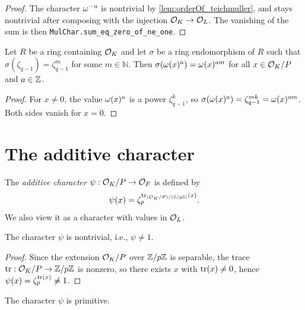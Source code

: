 \begin{proof}
  \leanok
  The character $\omega^{-a}$ is nontrivial by \ref{lem:orderOf_teichmuller}, and stays nontrivial
  after composing with the injection $\mathcal{O}_K \to \mathcal{O}_L$. The vanishing of the sum is then
  \texttt{MulChar.sum\_eq\_zero\_of\_ne\_one}.
\end{proof}

\begin{lemma}
  \label{lem:map_ringHomComp_teichmuller_zpow_apply}
  \leanok
  Let $R$ be a ring containing $\mathcal{O}_K$ and let $\sigma$ be a ring endomorphism of $R$ such that
  $\sigma(\zeta_{q-1}) = \zeta_{q-1}^m$ for some $m \in \mathbb{N}$. Then
  $\sigma(\omega(x)^a) = \omega(x)^{am}$ for all $x \in \mathcal{O}_K/P$ and $a \in \mathbb{Z}$.
\end{lemma}

\begin{proof}
  \leanok
  For $x \neq 0$, the value $\omega(x)^a$ is a power $\zeta_{q-1}^k$, so
  $\sigma(\omega(x)^a) = \zeta_{q-1}^{mk} = \omega(x)^{am}$. Both sides vanish for $x = 0$.
\end{proof}

\section{The additive character}

\begin{definition}
  \label{def:addchar}
  \leanok
  The \emph{additive character} $\psi : \mathcal{O}_K/P \to \mathcal{O}_F$ is defined by
  \[
    \psi(x) = \zeta_p^{\mathrm{tr}_{(\mathcal{O}_K/P)/(\mathbb{Z}/p\mathbb{Z})}(x)}.
  \]
  We also view it as a character with values in $\mathcal{O}_L$.
\end{definition}

\begin{lemma}
  \label{lem:addCharTrace_ne_one}
  \leanok
  The character $\psi$ is nontrivial, i.e., $\psi \neq 1$.
\end{lemma}

\begin{proof}
  \leanok
  Since the extension $\mathcal{O}_K/P$ over $\mathbb{Z}/p\mathbb{Z}$ is separable, the trace
  $\mathrm{tr} : \mathcal{O}_K/P \to \mathbb{Z}/p\mathbb{Z}$ is nonzero, so there exists $x$ with
  $\mathrm{tr}(x) \neq 0$, hence $\psi(x) = \zeta_p^{\mathrm{tr}(x)} \neq 1$.
\end{proof}

\begin{lemma}
  \label{lem:addCharTrace_isPrimitive}
  \leanok
  The character $\psi$ is primitive.
\end{lemma}

